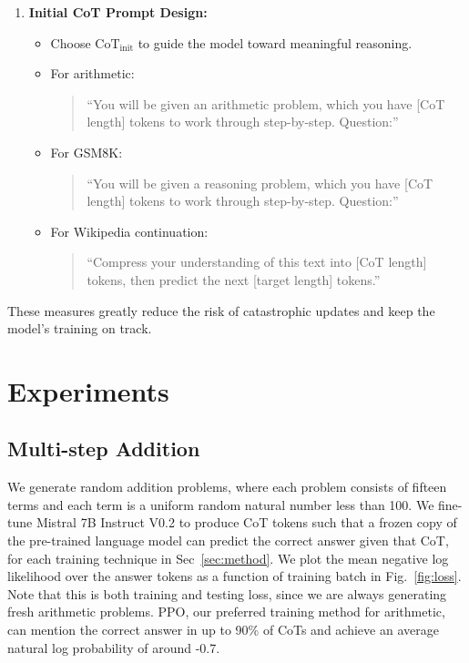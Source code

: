 \documentclass[letterpaper]{article} %
\begin{document}
\begin{enumerate}
    \item \textbf{Initial CoT Prompt Design:} 
    \begin{itemize}
        \item Choose $\text{CoT}_{\text{init}}$ to guide the model toward meaningful reasoning. 
        \item For arithmetic: 
        \begin{quote}
            \small
            ``You will be given an arithmetic problem, which you have [CoT length] tokens to work through step-by-step. Question:''
        \end{quote}
        \item For GSM8K:
        \begin{quote}
            \small
            ``You will be given a reasoning problem, which you have [CoT length] tokens to work through step-by-step. Question:''
        \end{quote}
        \item For Wikipedia continuation:
        \begin{quote}
            \small
            ``Compress your understanding of this text into [CoT length] tokens, then predict the next [target length] tokens.''
        \end{quote}
    \end{itemize}
\end{enumerate}

These measures greatly reduce the risk of catastrophic updates and keep the model's training on track.



\section{Experiments}
\label{sec:experiments}


\subsection{Multi-step Addition}
\label{subsec:solving}
We generate random addition problems, where each problem consists of fifteen terms and each term is a uniform random natural number less than 100. We fine-tune Mistral 7B Instruct V0.2 to produce CoT tokens such that a frozen copy of the pre-trained language model can predict the correct answer given that CoT, for each training technique in Sec~\ref{sec:method}. We plot the mean negative log likelihood over the answer tokens as a function of training batch in Fig.~\ref{fig:loss}. Note that this is both training and testing loss, since we are always generating fresh arithmetic problems. PPO, our preferred training method for arithmetic, can mention the correct answer in up to 90\% of CoTs and achieve an average natural log probability of around -0.7. 
\end{document}
